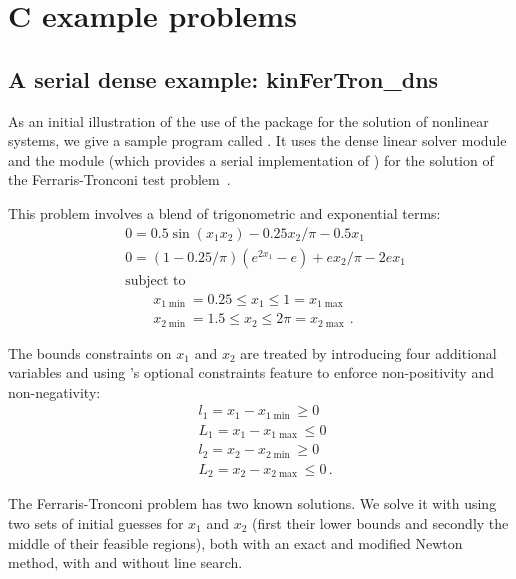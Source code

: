 \section{C example problems}\label{s:ex_c}

\subsection{A serial dense example: kinFerTron\_dns}\label{ss:kinFerTron_dns}

As an initial illustration of the use of the {\kinsol} package for the
solution of nonlinear systems, we give a sample program called .
It uses the {\kinsol} dense linear solver module {\sunlinsoldense} 
and the {\nvecs} module (which provides a serial implementation of {\nvector})
for the solution of the Ferraris-Tronconi test problem~\cite{FlPa:99}.

This problem involves a blend of trigonometric and exponential terms:
\begin{equation}
\begin{split}
  & 0 = 0.5 \sin(x_1 x_2) - 0.25 x_2/\pi - 0.5 x_1 \\
  & 0 = (1-0.25/\pi) ( e^{2 x_1} - e ) + e x_2 / \pi - 2 e x_1 \\
  &\text{subject to } \\
  &\qquad x_{1\min} = 0.25 \le x_1 \le 1 = x_{1\max} \\
  &\qquad x_{2\min} = 1.5 \le x_2 \le 2\pi = x_{2\max} \, .
\end{split}
\end{equation}

The bounds constraints on $x_1$ and $x_2$ are treated by introducing
four additional variables and using {\kinsol}'s optional constraints
feature to enforce non-positivity and non-negativity:
\begin{equation*}
\begin{split}
  &l_1 = x_1 - x_{1\min} \ge 0\\
  &L_1 = x_1 - x_{1\max} \le 0\\
  &l_2 = x_2 - x_{2\min} \ge 0\\
  &L_2 = x_2 - x_{2\max} \le 0 \, .
\end{split}
\end{equation*}

The Ferraris-Tronconi problem has two known solutions. We solve it with
{\kinsol} using two sets of initial guesses for $x_1$ and $x_2$ (first their 
lower bounds and secondly the middle of their feasible regions), both with
an exact and modified Newton method, with and without line search.

